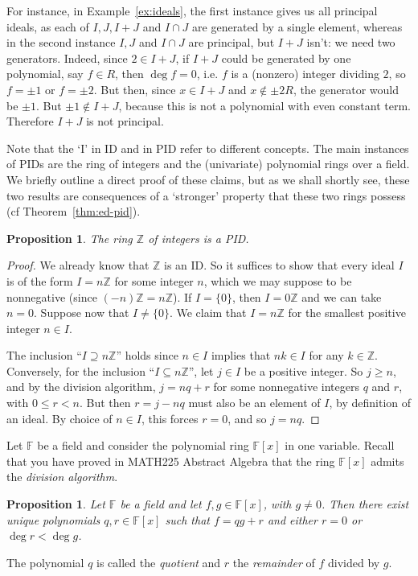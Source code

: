 \documentclass[12pt]{article}
\newtheorem{prop}[thm]{Proposition}
\theoremstyle{definition}
\newcounter{ex}\renewcommand\theex{\arabic{ex}}
\newcommand{\Z}{\ensuremath{\mathbb{Z}}}
\newcommand{\F}{\ensuremath{\mathbb{F}}}
\begin{document}
For instance, in Example~\ref{ex:ideals}, the first instance gives us
all principal ideals, as each of $I,J,I+J$ and $I\cap J$ are generated
by a single element, whereas in the second instance $I,J$ and $I\cap J$
are principal, but $I+J$ isn't: we need two generators. Indeed, since
$2\in I+J$, if $I+J$ could be generated by one polynomial, say $f\in R$,
then $\deg f=0$, i.e. $f$ is a (nonzero) integer dividing $2$, so
$f=\pm1$ or $f=\pm2$. But then, since $x\in I+J$ and $x\notin\pm2R$, the
generator would be $\pm1$. But $\pm1\notin I+J$, because this is not a
polynomial with even constant term. Therefore $I+J$ is not principal.

\smallskip


Note that the `I' in ID and in PID refer to different concepts. The
main instances of PIDs are the ring of integers and the (univariate)
polynomial rings over a field.
We briefly outline a direct proof of these claims, but as we shall
shortly see, these two results are consequences of a `stronger'
property that these two rings possess (cf Theorem~\ref{thm:ed-pid}).

\begin{prop}\label{prop:z-pid}
The ring $\Z$ of integers is a PID.
\end{prop}

\begin{proof}

We already know that $\Z$ is an ID. So it suffices to show that every
ideal $I$ is of the form $I=n\Z$ for some integer $n$, which we may
suppose to be nonnegative (since $(-n)\Z=n\Z$).
If $I=\{0\}$, then $I=0\Z$ and we can take $n=0$. Suppose now that
$I\neq\{0\}$. We claim that $I=n\Z$ for the smallest positive integer
$n\in I$. 

The inclusion ``$I\supseteq n\Z$'' holds since $n\in I$ implies that
$nk\in I$ for any $k\in\Z$. Conversely, for the inclusion
``$I\subseteq n\Z$'', let $j\in I$ be a positive integer. So $j\geq n$, and
by the division algorithm, $j=nq+r$ for some nonnegative integers $q$
and $r$, with $0\leq r<n$. But then $r=j-nq$ must also be an element
of $I$, by definition of an ideal. By choice of $n\in I$, this forces
$r=0$, and so $j=nq$.
\end{proof}

Let $\F$ be a field and consider the polynomial ring $\F[x]$ in one
variable. Recall that you have proved in MATH225 Abstract Algebra that
the ring $\F[x]$ admits the {\em division algorithm}.

\begin{prop}\label{div-alg}
Let $\F$ be a field and let $f,g\in\F[x]$, with $g\neq0$.
Then there exist unique polynomials
$q,r\in\F[x]$ such that $f=qg+r$ and either $r=0$ or $\deg r<\deg g$.
\end{prop}
The polynomial $q$ is called the
{\em quotient} and $r$ the
{\em remainder} of $f$ divided by $g$.
\end{document}

